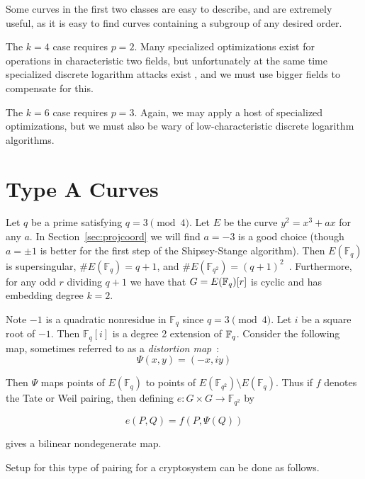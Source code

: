 Some curves in the first two classes are easy to describe, and are
extremely useful, as it is easy to find curves containing a
subgroup of any desired order.

The $k=4$ case requires $p=2$.
Many specialized optimizations exist for
operations in characteristic two fields,
but unfortunately at the same time specialized discrete logarithm attacks
exist \cite{coppersmith}, and we must use bigger fields to compensate for
this. 

The $k=6$ case requires $p=3$. Again, we may apply
a host of specialized optimizations, but we must also be wary of
low-characteristic discrete logarithm algorithms.

\section {Type A Curves}

Let $q$ be a prime satisfying $q = 3 \pmod{4}$.
Let $E$ be the curve $y^2 = x^3 + a x$ for any $a$.
In Section~\ref{sec:projcoord} we will find $a=-3$ is a good choice
(though $a=\pm1$ is better for the first step of the Shipsey-Stange algorithm).
Then
$E(\mathbb{F}_q)$ is supersingular,
$\#E(\mathbb{F}_q) = q+1$, and
$\#E(\mathbb{F}_{q^2}) = (q+1)^2$~\cite[\S 3.2]{fst}.
Furthermore, for any odd $r$ dividing $q + 1$ we have that
$G = E(\mathbb{F}_q)[r]$ is cyclic and has embedding degree $k = 2$.

Note $-1$ is a quadratic nonresidue in $\mathbb{F}_q$ since $q = 3\pmod{4}$.
Let $i$ be a square root of $-1$. Then $\mathbb{F}_q[i]$ is a degree 2
extension of $\mathbb{F}_q$.
Consider the following map, sometimes referred to as a \emph{distortion
map}~\cite{verheul}:
\[ \Psi(x, y) = (-x, i y) \]

Then $\Psi$ maps points of $E(\mathbb{F}_q)$ to points of
$E(\mathbb{F}_{q^2}) \setminus E(\mathbb{F}_q)$. Thus if $f$ denotes the
Tate or Weil pairing, then defining $e:G \times G \rightarrow \mathbb{F}_{q^2}$
by

\[ e(P,Q) = f(P, \Psi(Q)) \]

gives a bilinear nondegenerate map.

Setup for this type of pairing for a cryptosystem can be done as follows.

